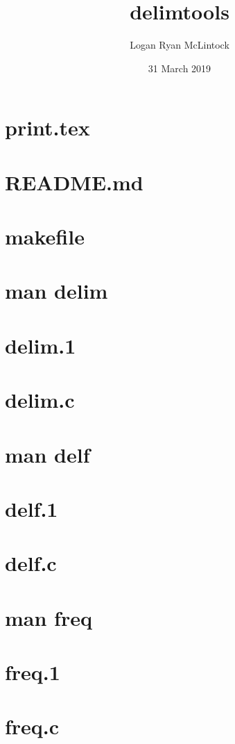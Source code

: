 \documentclass[titlepage, a4paper]{article}
\title{delimtools}
\date {31 March 2019}
\author{Logan Ryan McLintock}
\begin{document}
\maketitle

\tableofcontents
\newpage

\section{print.tex}
\newpage

\section{README.md}
\newpage

\section{makefile}
\newpage

\section{man delim}


\section{delim.1}
\newpage

\section{delim.c}
\newpage

\section{man delf}


\section{delf.1}
\newpage

\section{delf.c}
\newpage

\section{man freq}


\section{freq.1}
\newpage

\section{freq.c}
\end{document}
